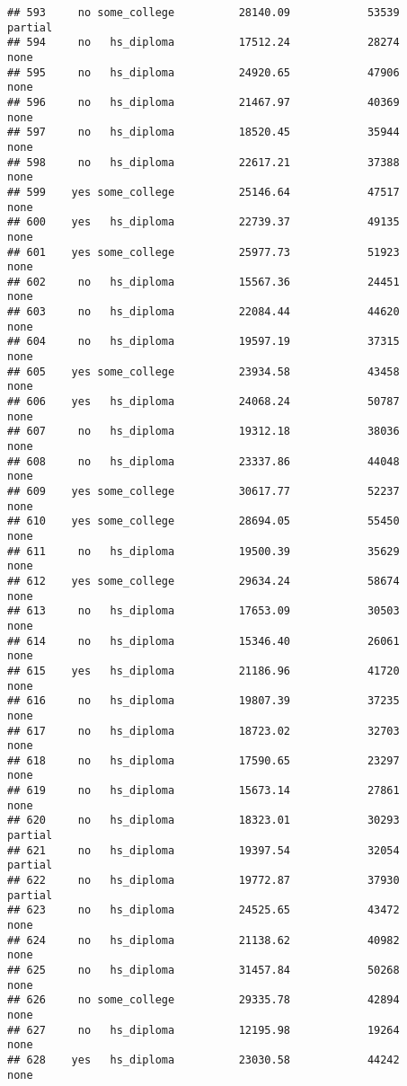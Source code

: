 \documentclass[
]{article}
\begin{document}
\begin{verbatim}
## 593     no some_college          28140.09            53539     partial
## 594     no   hs_diploma          17512.24            28274        none
## 595     no   hs_diploma          24920.65            47906        none
## 596     no   hs_diploma          21467.97            40369        none
## 597     no   hs_diploma          18520.45            35944        none
## 598     no   hs_diploma          22617.21            37388        none
## 599    yes some_college          25146.64            47517        none
## 600    yes   hs_diploma          22739.37            49135        none
## 601    yes some_college          25977.73            51923        none
## 602     no   hs_diploma          15567.36            24451        none
## 603     no   hs_diploma          22084.44            44620        none
## 604     no   hs_diploma          19597.19            37315        none
## 605    yes some_college          23934.58            43458        none
## 606    yes   hs_diploma          24068.24            50787        none
## 607     no   hs_diploma          19312.18            38036        none
## 608     no   hs_diploma          23337.86            44048        none
## 609    yes some_college          30617.77            52237        none
## 610    yes some_college          28694.05            55450        none
## 611     no   hs_diploma          19500.39            35629        none
## 612    yes some_college          29634.24            58674        none
## 613     no   hs_diploma          17653.09            30503        none
## 614     no   hs_diploma          15346.40            26061        none
## 615    yes   hs_diploma          21186.96            41720        none
## 616     no   hs_diploma          19807.39            37235        none
## 617     no   hs_diploma          18723.02            32703        none
## 618     no   hs_diploma          17590.65            23297        none
## 619     no   hs_diploma          15673.14            27861        none
## 620     no   hs_diploma          18323.01            30293     partial
## 621     no   hs_diploma          19397.54            32054     partial
## 622     no   hs_diploma          19772.87            37930     partial
## 623     no   hs_diploma          24525.65            43472        none
## 624     no   hs_diploma          21138.62            40982        none
## 625     no   hs_diploma          31457.84            50268        none
## 626     no some_college          29335.78            42894        none
## 627     no   hs_diploma          12195.98            19264        none
## 628    yes   hs_diploma          23030.58            44242        none

\end{verbatim}
\end{document}
